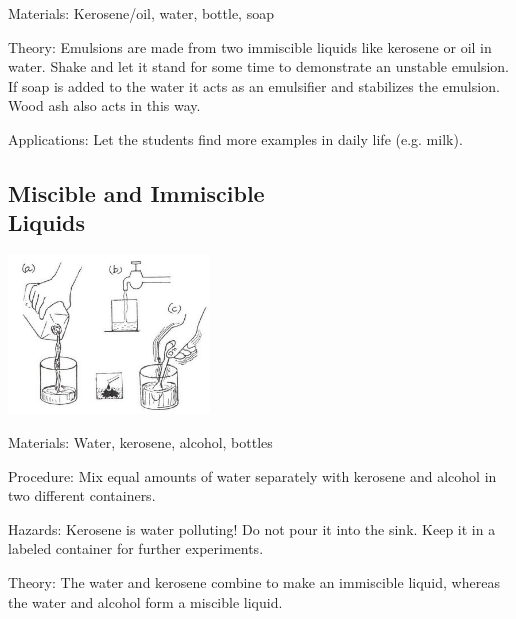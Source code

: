 \begin{multicols}{2}
\begin{description*}
\item[Materials:]{Kerosene/oil, water, bottle, soap}
\item[Theory:]{Emulsions are made from two immiscible
liquids like kerosene or oil in water. Shake and
let it stand for some time to demonstrate an
unstable emulsion. If soap is added to the water
it acts as an emulsifier and stabilizes the
emulsion. Wood ash also acts in this way. }
\item[Applications:]{Let the students find more examples in
daily life (e.g. milk).}
\end{description*}

\subsection[Miscible and Immiscible Liquids]{Miscible and Immiscible \hfill \\ Liquids} %

\begin{center}
\includegraphics[width=0.4\textwidth]{./img/source/miscible-immiscible.jpg}
\end{center}

\begin{description*}
\item[Materials:]{Water, kerosene, alcohol, bottles}
\item[Procedure:]{Mix equal amounts of water separately with
kerosene and alcohol in two different containers.}
\item[Hazards:]{Kerosene is water polluting! Do not pour it
into the sink. Keep it in a labeled container for
further experiments.}
\item[Theory:]{The water and kerosene combine to make an immiscible liquid, whereas the water and alcohol form a miscible liquid.}
\end{description*}


\end{multicols}
